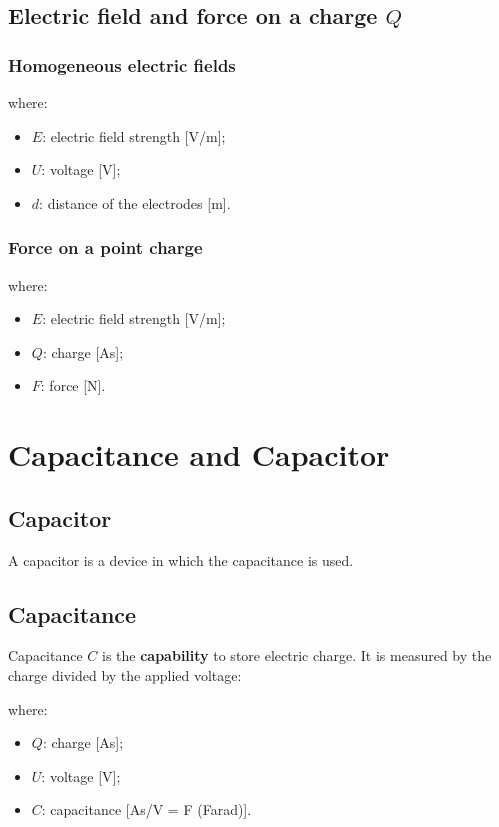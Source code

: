 \documentclass{article}
\begin{document}
\subsection{Electric field and force on a charge $Q$}
\subsubsection{Homogeneous electric fields}

where:
\begin{itemize}
    \item $E$: electric field strength [V/m];
    \item $U$: voltage [V];
    \item $d$: distance of the electrodes [m].
\end{itemize}

\subsubsection{Force on a point charge}

where:
\begin{itemize}
    \item $E$: electric field strength [V/m];
    \item $Q$: charge [As];
    \item $F$: force [N].
\end{itemize}

\newpage
\section{Capacitance and Capacitor}
\subsection{Capacitor}
A capacitor is a device in which the capacitance is used.

\subsection{Capacitance}
Capacitance $C$ is the \textbf{capability} to store electric charge.
It is measured by the charge divided by the applied voltage:

where:
\begin{itemize}
    \item $Q$: charge [As];
    \item $U$: voltage [V];
    \item $C$: capacitance [As/V = F (Farad)].
\end{itemize}
\end{document}
